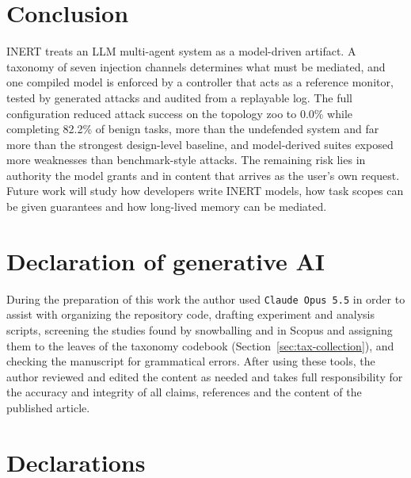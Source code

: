 \documentclass[pdflatex,sn-mathphys-num]{sn-jnl}
\theoremstyle{thmstyleone}%
\theoremstyle{thmstyletwo}%
\theoremstyle{thmstylethree}%
\begin{document}
\section{Conclusion}\label{sec:conclusion}

INERT treats an LLM multi-agent system as a model-driven artifact. A taxonomy of seven injection channels determines what must be mediated, and one compiled model is enforced by a controller that acts as a reference monitor, tested by generated attacks and audited from a replayable log. The full configuration reduced attack success on the topology zoo to 0.0\% while completing 82.2\% of benign tasks, more than the undefended system and far more than the strongest design-level baseline, and model-derived suites exposed more weaknesses than benchmark-style attacks. The remaining risk lies in authority the model grants and in content that arrives as the user's own request. Future work will study how developers write INERT models, how task scopes can be given guarantees and how long-lived memory can be mediated.

\backmatter

\section*{Declaration of generative AI}
During the preparation of this work the author used \texttt{Claude Opus 5.5} in order to assist with organizing the repository code, drafting experiment and analysis scripts, screening the studies found by snowballing and in Scopus and assigning them to the leaves of the taxonomy codebook (Section~\ref{sec:tax-collection}), and checking the manuscript for grammatical errors. After using these tools, the author reviewed and edited the content as needed and takes full responsibility for the accuracy and integrity of all claims, references and the content of the published article.

\section*{Declarations}
\end{document}
